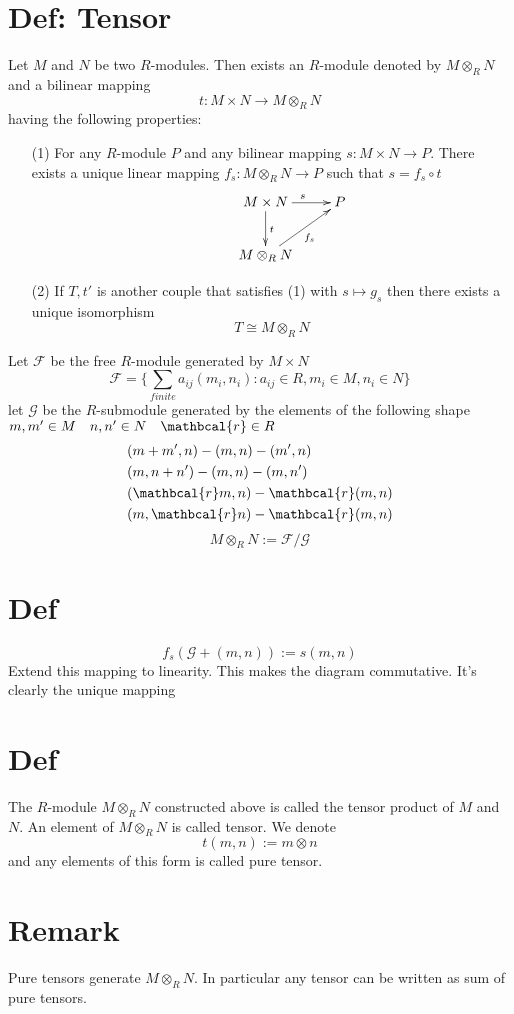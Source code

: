 \documentclass{book}
\begin{document}
\section{Def: Tensor}
Let $M$ and $N$ be two $R$-modules. Then exists an $R$-module denoted by $M\otimes _RN$ and a bilinear mapping 
$$t:M\times N\rightarrow M\otimes_RN$$ having the following properties:
\begin{itemize}
    \item[(1)]For any $R$-module $P$ and any bilinear mapping $s:M\times N\rightarrow P$. There exists a unique linear mapping $f_s:M\otimes_RN\rightarrow P$ such that $s=f_s\circ t$
    $$\xymatrix{
        & M\times N \ar[d]^t \ar[r]^s & P \\
        & M\otimes_RN\ar[ur]_{f_s}&
    } $$
    \item[(2)] If $T,t'$ is another couple that satisfies (1) with $s\mapsto g_s$ then there exists a unique isomorphism $$T\cong M\otimes_RN$$
\end{itemize}

Let $\mathcal{F}$ be the free $R$-module generated by $M\times N$
    $$\mathcal{F}=\{\sum\limits_{finite}a_{ij}(m_i,n_i):a_{ij}\in R,m_i\in M,n_i\in N\}$$
    let $\mathcal{G}$ be the $R$-submodule generated by the elements of the following shape $m,m'\in M\quad n,n'\in N\quad \mathbcal{r}\in R$
    $$\begin{aligned}
        &(m+m',n)-(m,n)-(m',n)\\
        &(m,n+n')-(m,n)-(m,n')\\
        &(\mathbcal{r}m,n)-\mathbcal{r}(m,n)\\
        &(m,\mathbcal{r}n)-\mathbcal{r}(m,n)
    \end{aligned}$$
    $$M\otimes_RN:=\mathcal{F}/\mathcal{G}$$
\section{Def}
$$f_s(\mathcal{G}+(m,n)):=s(m,n)$$
Extend this mapping to linearity. This makes the diagram commutative. It's clearly the unique mapping
\section{Def}
The $R$-module $M\otimes_RN$ constructed above is called the tensor product of $M$ and $N$. An element of $M\otimes_RN$ is called tensor. We denote$$t(m,n):=m\otimes n$$ and any elements of this form is called pure tensor. 
\section{Remark}Pure tensors generate $M\otimes_R N$. In particular any tensor can be written as sum of pure tensors.
\end{document}
